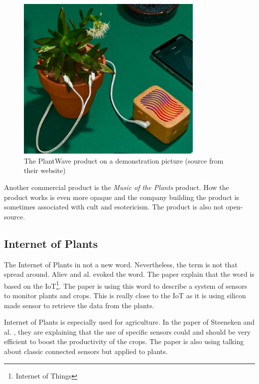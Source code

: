 \begin{figure}[h!]
    \centering
    \includegraphics[width=0.8\textwidth]{images/plant_wave_product.png}
    \caption{The PlantWave product on a demonstration picture (source from their website)} 
    \vspace{0.1cm}
    \label{fig:plant_wave_product}
\end{figure}

Another commercial product is the \textit{Music of the Plants} product. How the product works is even more opaque and the company building the product
is sometimes associated with cult and esotericism. The product is also not open-source.


\subsection{Internet of Plants}

The Internet of Plants in not a new word. Nevertheless, the term is not that spread around.
Aliev and al. \cite{alievInternetPlantsApplication2018} evoked the word. The paper explain that
the word is based on the IoT\footnote{Internet of Things}. The paper is using this word 
to describe a system of sensors to monitor plants and crops. This is really close to the IoT
as it is using silicon made sensor to retrieve the data from the plants.

Internet of Plants is especially used for agriculture. In the paper of Steeneken and al.
\cite{steenekenSensorsAgricultureInternet2023}, they are explaining that the use of specific
sensors could and should be very efficient to boost the productivity of the crops.
The paper is also using talking about classic connected sensors but applied to plants.

